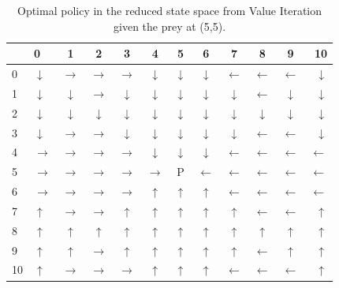 \documentclass[paper=a4, fontsize=11pt]{scrartcl}
\numberwithin{equation}{section}		%
\numberwithin{figure}{section}			%
\numberwithin{table}{section}				%
\begin{document}
\begin{table}[H]
\caption{Optimal policy in the reduced state space from Value Iteration given the prey at (5,5).}
\centering
\begin{tabular}{l|l*{9}{c}r}
  \hline
 & 0 & 1 & 2 & 3 & 4 & 5 & 6 & 7 & 8 & 9 & 10 \\ \hline
0 & $\downarrow$& $\rightarrow$& $\rightarrow$& $\rightarrow$& $\downarrow$& $\downarrow$& $\downarrow$& $\leftarrow$& $\leftarrow$& $\leftarrow$& $\downarrow$ \\
1 & $\downarrow$& $\downarrow$& $\rightarrow$& $\downarrow$& $\downarrow$& $\downarrow$& $\downarrow$& $\downarrow$& $\leftarrow$& $\downarrow$& $\downarrow$ \\
2 & $\downarrow$& $\downarrow$& $\downarrow$& $\downarrow$& $\downarrow$& $\downarrow$& $\downarrow$& $\downarrow$& $\downarrow$& $\downarrow$& $\downarrow$ \\
3 & $\downarrow$& $\rightarrow$& $\rightarrow$& $\downarrow$& $\downarrow$& $\downarrow$& $\downarrow$& $\downarrow$& $\leftarrow$& $\leftarrow$& $\downarrow$ \\
4 & $\rightarrow$& $\rightarrow$& $\rightarrow$& $\rightarrow$& $\downarrow$& $\downarrow$& $\downarrow$& $\leftarrow$& $\leftarrow$& $\leftarrow$& $\leftarrow$ \\
5 & $\rightarrow$& $\rightarrow$& $\rightarrow$& $\rightarrow$& $\rightarrow$& P& $\leftarrow$& $\leftarrow$& $\leftarrow$& $\leftarrow$& $\leftarrow$ \\
6 & $\rightarrow$& $\rightarrow$& $\rightarrow$& $\rightarrow$& $\uparrow$& $\uparrow$& $\uparrow$& $\leftarrow$& $\leftarrow$& $\leftarrow$& $\leftarrow$ \\
7 & $\uparrow$& $\rightarrow$& $\rightarrow$& $\uparrow$& $\uparrow$& $\uparrow$& $\uparrow$& $\uparrow$& $\leftarrow$& $\leftarrow$& $\uparrow$ \\
8 & $\uparrow$& $\uparrow$& $\uparrow$& $\uparrow$& $\uparrow$& $\uparrow$& $\uparrow$& $\uparrow$& $\uparrow$& $\uparrow$& $\uparrow$ \\
9 & $\uparrow$& $\uparrow$& $\rightarrow$& $\uparrow$& $\uparrow$& $\uparrow$& $\uparrow$& $\uparrow$& $\leftarrow$& $\uparrow$& $\uparrow$ \\
10 & $\uparrow$& $\rightarrow$& $\rightarrow$& $\rightarrow$& $\uparrow$& $\uparrow$& $\uparrow$& $\leftarrow$& $\leftarrow$& $\leftarrow$& $\uparrow$ \\
\end{tabular}
\label{table:optimalPolicy}
\end{table}
\end{document}
